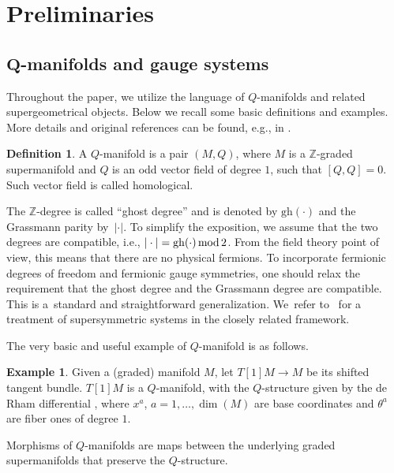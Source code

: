 \documentclass[pdftex]{sigma}
\numberwithin{equation}{section}
\theoremstyle{definition}
\newtheorem{Definition}[Theorem]{Definition}
\newtheorem{Example}[Theorem]{Example}
\renewcommand{\mod}{\,\rm mod \,}
\newcommand{\p}[1]{|#1|}
\newcommand{\gh}[1]{\mathrm{gh}(#1)}
\newcommand{\fZ}{\mathbb{Z}}
\begin{document}
\section{Preliminaries}
\label{sec:prelim}
\subsection[Q-manifolds and gauge systems]{$\boldsymbol{Q}$-manifolds and gauge systems}

Throughout the paper, we utilize the language of $Q$-manifolds and related supergeometrical objects. Below we recall some basic definitions and examples.
More details and original references can be found, e.g., in \cite{Kotov:2007nr,Mehta:2007rgt,Schwarz:1992nx,Vaintrob:1997,Voronov:2009nr}.
\begin{Definition}
 A $Q$-manifold is a pair $(M,Q)$, where $M$ is a $\mathbb{Z}$-graded supermanifold and $Q$ is an odd vector field of degree $1$, such that $[Q,Q]=0$. Such vector field is called homological.
\end{Definition}
The $\fZ$-degree is called ``ghost degree'' and is denoted by $\gh{\cdot}$ and the Grassmann parity by~$\p{\cdot}$. To simplify the exposition, we assume that the two degrees are compatible, i.e., ${\p{\cdot}=\gh{\cdot} \mod 2}$.
From the field theory point of view, this means that there are no physical fermions. To incorporate fermionic degrees of freedom and fermionic gauge symmetries, one should relax the requirement that the ghost degree and the Grassmann degree are compatible. This is a~standard and straightforward generalization. We~refer to~\cite{Grigoriev:2025vsl} for a treatment of supersymmetric systems in the closely related framework.

The very basic and useful example of $Q$-manifold is as follows.

\begin{Example}
 Given a (graded) manifold $M$, let $T[1]M\rightarrow M$ be its shifted tangent bundle. $T[1]M$ is a $Q$-manifold, with the $Q$-structure given by the de Rham differential , where $x^a$, $a=1,\dots, \dim(M)$
 are base coordinates and $\theta^a$ are fiber ones of degree $1$.
\end{Example}

Morphisms of $Q$-manifolds are maps between the underlying graded supermanifolds that preserve the $Q$-structure.
\end{document}
